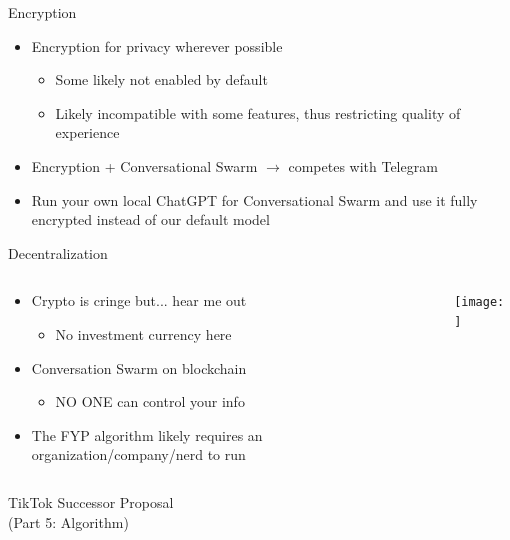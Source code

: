 \documentclass[aspectratio=169]{beamer}
\begin{document}
\begin{frame}{Encryption}
\begin{itemize}
    \item Encryption for privacy wherever possible
    \begin{itemize}
        \item Some likely not enabled by default
        \item Likely incompatible with some features, thus restricting quality of experience
    \end{itemize}
    \item Encryption + Conversational Swarm $\rightarrow$ competes with Telegram
    \item Run your own local ChatGPT for Conversational Swarm and use it fully encrypted instead of our default model
\end{itemize}
\end{frame}

\begin{frame}{Decentralization}
\begin{columns}[T]
    \begin{column}[T]{0.5\textwidth}
        \begin{itemize}
            \item Crypto is cringe but... hear me out
            \begin{itemize}
                \item No investment currency here
            \end{itemize}
            \item Conversation Swarm on blockchain
            \begin{itemize}
                \item NO ONE can control your info
            \end{itemize}
            \item The FYP algorithm likely requires an organization/company/nerd to run
        \end{itemize}
    \end{column}
    \begin{column}{0.5\textwidth}
        \texttt{[image: ]}
    \end{column}
\end{columns}
\end{frame}

\begin{frame}
    \centering
    \Huge TikTok Successor Proposal \\
    \Huge (Part 5: Algorithm)
\end{frame}
\end{document}
